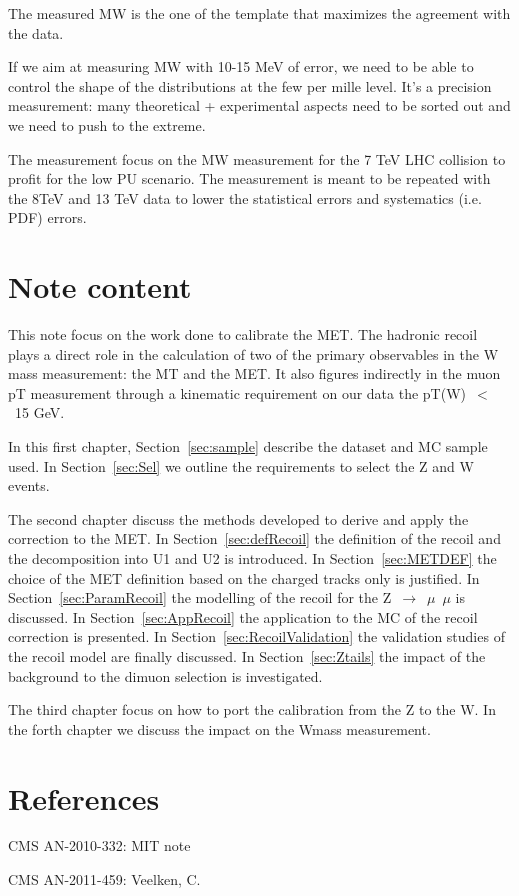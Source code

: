 The measured MW is the one of the template that maximizes the agreement with the data.

If we aim at measuring MW with 10-15 MeV of error, we need to be able to control the shape of the distributions at the few per mille level.
{\color{magenta}{Add the plot of the ratio of the MT template with two different mass hyphothesis}}
It’s a precision measurement: many theoretical + experimental aspects need to be sorted out and we need to push to the extreme. 

The measurement focus on the MW measurement for the 7 TeV LHC collision to profit for the low PU scenario.
The measurement is meant to be repeated with the 8TeV and 13 TeV data to lower the statistical errors and systematics (i.e. PDF) errors.

\section{Note content}

This note focus on the work done to calibrate the MET.
The hadronic recoil plays a direct role in the calculation of two of the primary observables in the W mass measurement: the MT and the MET. 
It also figures indirectly in the muon pT measurement through a kinematic requirement on our data the pT(W)~$<$~15 GeV.

In this first chapter, Section~\ref{sec:sample} describe the dataset and MC sample used. In Section~\ref{sec:Sel} we outline the requirements to select the Z and W events.

The second chapter discuss the methods developed to derive and apply the correction to the MET.
In Section~\ref{sec:defRecoil} the definition of the recoil and the decomposition into U1 and U2 is introduced.
In Section~\ref{sec:METDEF} the choice of the MET definition based on the charged tracks only is justified.
In Section~\ref{sec:ParamRecoil} the modelling of the recoil for the Z~$\rightarrow$~$\mu$~$\mu$ is discussed.
In Section~\ref{sec:AppRecoil} the application to the MC of the recoil correction is presented.
In Section~\ref{sec:RecoilValidation} the validation studies of the recoil model are finally discussed.
In Section~\ref{sec:Ztails} the impact of the background to the dimuon selection is investigated.

The third chapter focus on how to port the calibration from the Z to the W.
In the forth chapter we discuss the impact on the Wmass measurement.

\section{References}
\begin{description}
\item CMS AN-2010-332: MIT note
\item CMS AN-2011-459: Veelken, C.
\end{description}


